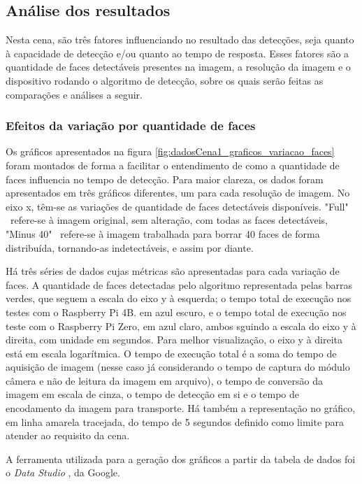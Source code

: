 \subsection{Análise dos resultados}
Nesta cena, são três fatores influenciando no resultado das detecções, seja quanto à capacidade de detecção e/ou quanto ao tempo de resposta. Esses fatores são a quantidade de faces detectáveis presentes na imagem, a resolução da imagem e o dispositivo rodando o algoritmo de detecção, sobre os quais serão feitas as comparações e análises a seguir.

\subsubsection{Efeitos da variação por quantidade de faces}

Os gráficos apresentados na figura \ref{fig:dadosCena1_graficos_variacao_faces} foram montados de forma a facilitar o entendimento de como a quantidade de faces influencia no tempo de detecção. Para maior clareza, os dados foram apresentados em três gráficos diferentes, um para cada resolução de imagem.
No eixo x, têm-se as variações de quantidade de faces detectáveis disponíveis. "Full" \ refere-se à imagem original, sem alteração, com todas as faces detectáveis, "Minus 40" \ refere-se à imagem trabalhada para borrar 40 faces de forma distribuída, tornando-as indetectáveis, e assim por diante.

Há três séries de dados cujas métricas são apresentadas para cada variação de faces. A quantidade de faces detectadas pelo algoritmo representada pelas barras verdes, que seguem a escala do eixo y à esquerda; o tempo total de execução nos testes com o Raspberry Pi 4B. em azul escuro, e o tempo total de execução nos teste com o Raspberry Pi Zero, em azul claro, ambos sguindo a escala do eixo y à direita, com unidade em segundos. Para melhor visualização, o eixo y à direita está em escala logarítmica.
O tempo de execução total é a soma do tempo de aquisição de imagem (nesse caso já considerando o tempo de captura do módulo câmera e não de leitura da imagem em arquivo), o tempo de conversão da imagem em escala de cinza, o tempo de detecção em si e o tempo de encodamento da imagem para transporte.
Há também a representação no gráfico, em linha amarela tracejada, do tempo de 5 segundos definido como limite para atender ao requisito da cena.

A ferramenta utilizada para a geração dos gráficos a partir da tabela de dados foi o \emph{Data Studio} \cite{DataStudio}, da Google.

